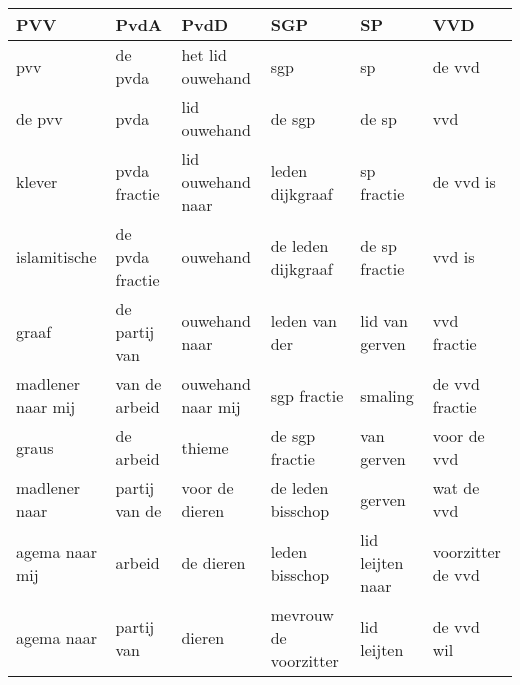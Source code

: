\begin{tabular}{llllll}
\toprule
               PVV &             PvdA &               PvdD &                    SGP &                SP &                VVD \\
\midrule
               pvv &          de pvda &   het lid ouwehand &                    sgp &                sp &             de vvd \\
            de pvv &             pvda &       lid ouwehand &                 de sgp &             de sp &                vvd \\
            klever &     pvda fractie &  lid ouwehand naar &        leden dijkgraaf &        sp fractie &          de vvd is \\
      islamitische &  de pvda fractie &           ouwehand &     de leden dijkgraaf &     de sp fractie &             vvd is \\
             graaf &    de partij van &      ouwehand naar &          leden van der &    lid van gerven &        vvd fractie \\
 madlener naar mij &    van de arbeid &  ouwehand naar mij &            sgp fractie &           smaling &     de vvd fractie \\
             graus &        de arbeid &             thieme &         de sgp fractie &        van gerven &        voor de vvd \\
     madlener naar &    partij van de &     voor de dieren &      de leden bisschop &            gerven &         wat de vvd \\
    agema naar mij &           arbeid &          de dieren &         leden bisschop &  lid leijten naar &  voorzitter de vvd \\
        agema naar &       partij van &             dieren &  mevrouw de voorzitter &       lid leijten &         de vvd wil \\
\bottomrule
\end{tabular}
